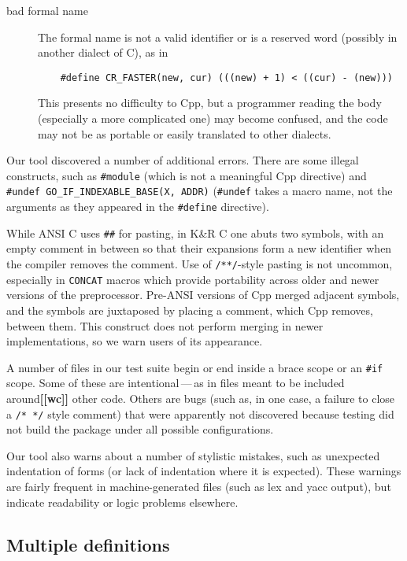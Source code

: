 \documentclass[10pt]{article}
\newcommand{\comment}[1]{\textbf{[[#1]]}}
\begin{document}
\begin{description}
\item[bad formal name]
        The formal name is not a valid identifier or is a reserved word
        (possibly in another dialect of C), as in
\begin{verbatim}
    #define CR_FASTER(new, cur) (((new) + 1) < ((cur) - (new)))
\end{verbatim}
        This presents no difficulty to Cpp, but a programmer reading the
        body (especially a more complicated one) may become confused, and
        the code may not be as portable or easily translated to other
        dialects.

\end{description}


Our tool discovered a number of additional
errors.  There are some illegal constructs, such as {\tt \#module} (which
is not a meaningful Cpp directive) and {\tt \#undef
\verb|GO_IF_INDEXABLE_BASE|(X, ADDR)} ({\tt \#undef} takes a macro name,
not the arguments as they appeared in the {\tt \#define} directive).
  
While ANSI C uses {\tt \#\#} for pasting, in K\&R C one abuts two symbols,
with an empty comment in between so that their expansions form a new
identifier when the compiler removes the comment.
Use of {\tt /**/}-style pasting is not uncommon, especially in {\tt CONCAT}
macros which provide portability across older and newer versions of the
preprocessor.  Pre-ANSI versions of Cpp merged adjacent symbols, and the
symbols are juxtaposed by placing a comment, which Cpp removes, between
them.  This construct does not perform merging in newer implementations,
so we warn users of its appearance.

A number of files in our test suite begin or end inside a brace scope or an
{\tt \#if} scope.  Some of these are intentional\,---\,as in files meant
to be included around\comment{wc} other code.  Others are bugs (such as, in one case, a
failure to close a {\tt /* */} style comment) that were apparently not
discovered because testing did not build the package under all possible
configurations.

Our tool also warns about a number of stylistic mistakes, such as
unexpected indentation of forms (or lack of indentation where it is
expected).  These warnings are fairly frequent in machine-generated files
(such as lex and yacc output), but indicate readability or logic problems
elsewhere.


\subsection{Multiple definitions}
\label{sec:mult-def}
\end{document}
